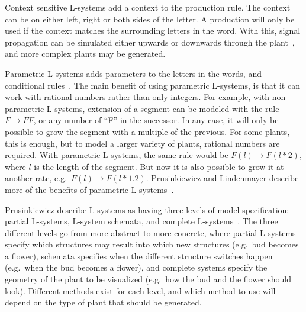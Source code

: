 

Context sensitive \glspl{L-system} add a context to the production rule.
The context can be on either left, right or both sides of the letter.
A production will only be used if the context matches the surrounding letters in the word.
With this, signal propagation can be simulated either upwards or downwards through the plant~\cite{2012Prusinkiewicz}, and more complex plants may be generated.

Parametric \glspl{L-system} adds parameters to the letters in the words, and conditional rules~\cite{2012Prusinkiewicz}.
The main benefit of using parametric \glspl{L-system}, is that it can work with rational numbers rather than only integers.
For example, with non-parametric \glspl{L-system}, extension of a segment can be modeled with the rule $F\rightarrow FF$, or any number of ``F'' in the successor.
In any case, it will only be possible to grow the segment with a multiple of the previous.
For some plants, this is enough, but to model a larger variety of plants, rational numbers are required.
With parametric \glspl{L-system}, the same rule would be $F(l)\rightarrow F(l*2)$, where $l$ is the length of the segment.
But now it is also possible to grow it at another rate, e.g.\ $F(l)\rightarrow F(l*1.2)$.
Prusinkiewicz and Lindenmayer describe more of the benefits of parametric \glspl{L-system}~\cite{2012Prusinkiewicz}.

Prusinkiewicz describe \glspl{L-system} as having three levels of model specification: partial \glspl{L-system}, \gls{L-system} schemata, and complete \glspl{L-system}~\cite{2012Prusinkiewicz}.
The three different levels go from more abstract to more concrete, where partial \glspl{L-system} specify which structures may result into which new structures (e.g.\ bud becomes a flower), schemata specifies when the different structure switches happen (e.g.\ when the bud becomes a flower), and complete systems specify the geometry of the plant to be visualized (e.g.\ how the bud and the flower should look).
Different methods exist for each level, and which method to use will depend on the type of plant that should be generated.

